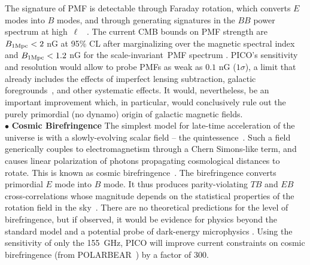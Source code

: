 \documentclass[PICOReport.tex]{subfiles}
\begin{document}
The signature of PMF is detectable through Faraday rotation, which converts $E$ modes into $B$ modes, and through generating signatures in the $BB$ power spectrum at high~$\ell$~\cite{??} . 
The current CMB bounds on PMF strength  are $B_{\rm 1Mpc}<2$ nG at 95\% CL after marginalizing over the magnetic spectral index and $B_{\rm 1Mpc}<1.2$ nG for the scale-invariant~PMF spectrum \cite{Zucca:2016iur}.  PICO's sensitivity and resolution would allow to probe PMFs as weak as $0.1$ nG ($1\sigma$), a limit that already includes the effects of imperfect lensing subtraction, galactic foregrounds~\cite{Oppermann:2011td,De:2013dra,Pogosian:2013dya}, and other systematic effects. It would, nevertheless, be an important improvement which, in particular, would conclusively rule out the purely primordial (no dynamo) origin of galactic magnetic fields.
 \\
%
$\bullet$ {\bf Cosmic Birefringence} \hspace{0.1in}
The simplest model for late-time acceleration of the universe is with a slowly-evolving scalar field -- the quintessence~\cite{Carroll:1998zi}. Such a field generically couples to electromagnetism through a Chern Simons-like term, and causes linear polarization of photons propagating cosmological distances to rotate. This is known as cosmic birefringence~\cite{Carroll:1998zi}. The birefringence converts primordial $E$ mode into $B$ mode. It thus produces parity-violating $TB$ and $EB$ cross-correlations whose magnitude depends on the statistical properties of the rotation field in the sky~\cite{Kamionkowski:2008fp,Gluscevic:2009mm}. There are no theoretical predictions for the level of birefringence, but if observed, it would be evidence for physics beyond the standard model and a potential probe of dark-energy microphysics . Using the sensitivity of only the 155~GHz, PICO will improve current constraints on cosmic birefringence (from POLARBEAR~\cite{Ade:2015cao}) by a factor of 300. 
\end{document}

